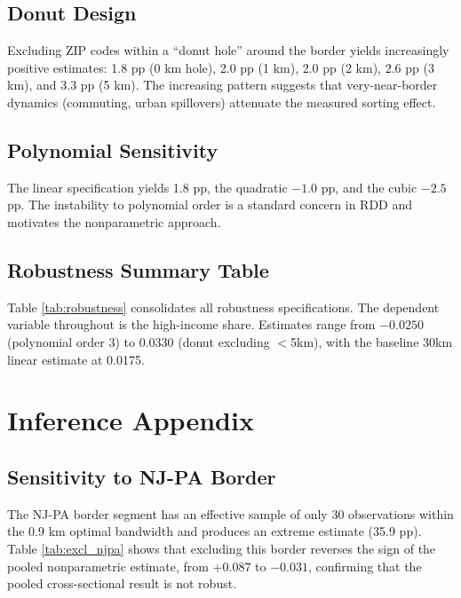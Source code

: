 \documentclass[12pt]{article}
\begin{document}
\subsection{Donut Design}

Excluding ZIP codes within a ``donut hole'' around the border yields increasingly positive estimates: 1.8 pp (0 km hole), 2.0 pp (1 km), 2.0 pp (2 km), 2.6 pp (3 km), and 3.3 pp (5 km). The increasing pattern suggests that very-near-border dynamics (commuting, urban spillovers) attenuate the measured sorting effect.

\subsection{Polynomial Sensitivity}

The linear specification yields 1.8 pp, the quadratic $-1.0$ pp, and the cubic $-2.5$ pp. The instability to polynomial order is a standard concern in RDD and motivates the nonparametric approach.

\subsection{Robustness Summary Table}

Table \ref{tab:robustness} consolidates all robustness specifications. The dependent variable throughout is the high-income share. Estimates range from $-0.0250$ (polynomial order 3) to 0.0330 (donut excluding $<$5km), with the baseline 30km linear estimate at 0.0175.



\section{Inference Appendix}

\subsection{Sensitivity to NJ-PA Border}



The NJ-PA border segment has an effective sample of only 30 observations within the 0.9 km optimal bandwidth and produces an extreme estimate (35.9 pp). Table \ref{tab:excl_njpa} shows that excluding this border reverses the sign of the pooled nonparametric estimate, from $+0.087$ to $-0.031$, confirming that the pooled cross-sectional result is not robust.
\end{document}
